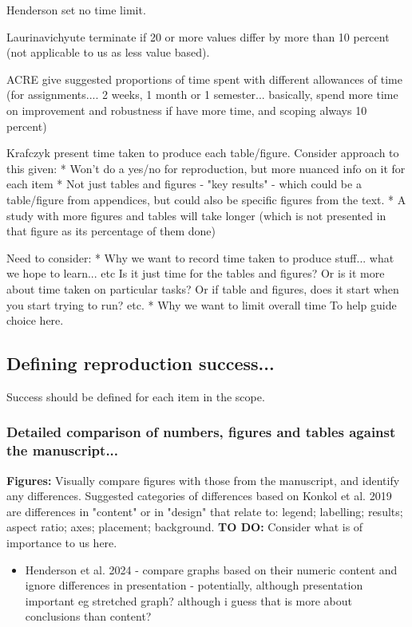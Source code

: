 Henderson set no time limit.\autocite{henderson_reproducibility_2024}

Laurinavichyute terminate if 20 or more values differ by more than 10 percent (not applicable to us as less value based).\autocite{laurinavichyute_share_2022}

ACRE give suggested proportions of time spent with different allowances of time (for assignments.... 2 weeks, 1 month or 1 semester... basically, spend more time on improvement and robustness if have more time, and scoping always 10 percent)

Krafczyk present time taken to produce each table/figure. Consider approach to this given:
* Won't do a yes/no for reproduction, but more nuanced info on it for each item
* Not just tables and figures - "key results" - which could be a table/figure from appendices, but could also be specific figures from the text.
* A study with more figures and tables will take longer (which is not presented in that figure as its percentage of them done)

Need to consider:
* Why we want to record time taken to produce stuff... what we hope to learn... etc Is it just time for the tables and figures? Or is it more about time taken on particular tasks? Or if table and figures, does it start when you start trying to run? etc.
* Why we want to limit overall time
To help guide choice here.

\subsection{Defining reproduction success...}

Success should be defined for each item in the scope.

\subsubsection{Detailed comparison of numbers, figures and tables against the manuscript...}

\textbf{Figures:} Visually compare figures with those from the manuscript, and identify any differences. Suggested categories of differences based on Konkol et al. 2019\autocite{konkol_computational_2019} are differences in "content" or in "design" that relate to: legend; labelling; results; aspect ratio; axes; placement; background.\autocite{konkol_computational_2019} \textbf{TO DO:} Consider what is of importance to us here.

\begin{itemize}
    \item Henderson et al. 2024 - compare graphs based on their numeric content and ignore differences in presentation\autocite{mcmanus_can_2019} - potentially, although presentation important eg stretched graph? although i guess that is more about conclusions than content?
\end{itemize}

